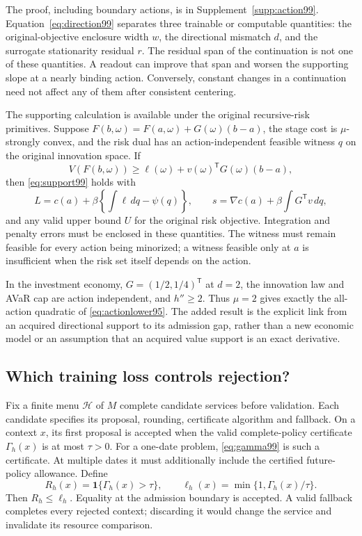 The proof, including boundary actions, is in Supplement~\ref{supp:action99}. Equation~\eqref{eq:direction99} separates three trainable or computable quantities: the original-objective enclosure width $w$, the directional mismatch $d$, and the surrogate stationarity residual $r$. The residual span of the continuation is not one of these quantities. A readout can improve that span and worsen the supporting slope at a nearly binding action. Conversely, constant changes in a continuation need not affect any of them after consistent centering.

The supporting calculation is available under the original recursive-risk primitives. Suppose $F(b,\omega)=F(a,\omega)+G(\omega)(b-a)$, the stage cost is $\mu$-strongly convex, and the risk dual has an action-independent feasible witness $q$ on the original innovation space. If
\[
 V(F(b,\omega))\ge \ell(\omega)+v(\omega)^{\mathsf T}G(\omega)(b-a),
\]
then \eqref{eq:support99} holds with
\begin{equation}\label{eq:lift99}
 L=c(a)+\beta\left\{\int\ell\,dq-\psi(q)\right\},\qquad
 s=\nabla c(a)+\beta\int G^{\mathsf T}v\,dq,
\end{equation}
and any valid upper bound $U$ for the original risk objective. Integration and penalty errors must be enclosed in these quantities. The witness must remain feasible for every action being minorized; a witness feasible only at $a$ is insufficient when the risk set itself depends on the action.

In the investment economy, $G=(1/2,1/4)^{\mathsf T}$ at $d=2$, the innovation law and AVaR cap are action independent, and $h''\ge2$. Thus $\mu=2$ gives exactly the all-action quadratic of \eqref{eq:actionlower95}. The added result is the explicit link from an acquired directional support to its admission gap, rather than a new economic model or an assumption that an acquired value support is an exact derivative.

\subsection{Which training loss controls rejection?}
Fix a finite menu $\mathcal H$ of $M$ complete candidate services before validation. Each candidate specifies its proposal, rounding, certificate algorithm and fallback. On a context $x$, its first proposal is accepted when the valid complete-policy certificate $\Gamma_h(x)$ is at most $\tau>0$. For a one-date problem, \eqref{eq:gamma99} is such a certificate. At multiple dates it must additionally include the certified future-policy allowance. Define
\begin{equation}\label{eq:loss99}
 R_h(x)=\boldsymbol 1\{\Gamma_h(x)>\tau\},\qquad
 \ell_h(x)=\min\{1,\Gamma_h(x)/\tau\}.
\end{equation}
Then $R_h\le\ell_h$. Equality at the admission boundary is accepted. A valid fallback completes every rejected context; discarding it would change the service and invalidate its resource comparison.


